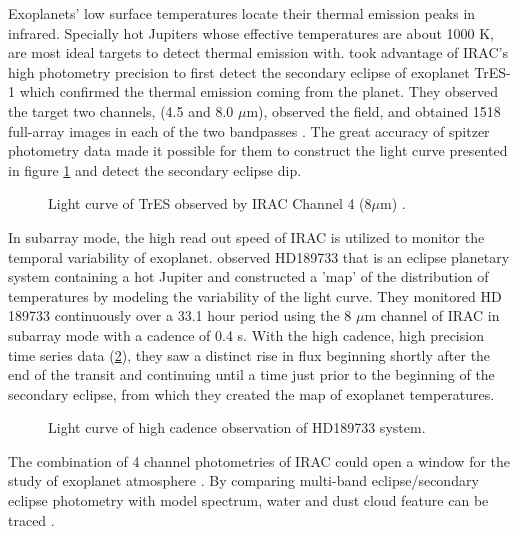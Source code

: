 \documentclass[preprint, 12pt]{aastex}
\begin{document}
Exoplanets' low surface temperatures locate their thermal emission
peaks in infrared. Specially hot Jupiters whose effective
temperatures are about 1000 K, are most ideal targets to detect
thermal emission with. \citep{2005ApJ...626..523C} took advantage of IRAC's
high photometry precision to first detect the secondary eclipse of
exoplanet TrES-1 which confirmed the thermal emission coming from the
planet. They observed the target two channels, (4.5 and 8.0 $\mu$m),
observed the field, and obtained 1518 full-array images in each of the
two bandpasses \citep{2005ApJ...626..523C}. The great accuracy of spitzer
photometry data made it possible for them to construct the light curve
presented in figure \ref{fig:irac-lc} and detect the secondary eclipse
dip.\par

\begin{figure}
  \centering
  \caption{Light curve of TrES observed by IRAC Channel 4 (8$\mu$m)
    \citep{2005ApJ...626..523C}.}
  \label{fig:irac-lc}
\end{figure}

In subarray mode, the high read out speed of IRAC is utilized to
monitor the temporal variability of exoplanet. \citet{2007Natur.447..183K}
observed HD189733 that is an eclipse planetary system containing a hot
Jupiter and constructed a ’map’ of the distribution of temperatures by
modeling the variability of the light curve. They monitored HD 189733
continuously over a 33.1 hour period using the 8 $\mu$m channel of
IRAC in subarray mode with a cadence of 0.4 s. With the high cadence,
high precision time series data (\ref{fig:iraf-lc2}), they saw a
distinct rise in flux beginning shortly after the end of the transit
and continuing until a time just prior to the beginning of the
secondary eclipse, from which they created the map of exoplanet
temperatures.\par

\begin{figure}
  \centering
  \caption{Light curve of high cadence observation of HD189733
    system\citep{2007Natur.447..183K}. }
  \label{fig:iraf-lc2}
\end{figure}

The combination of 4 channel photometries of IRAC could open a window
for the study of exoplanet atmosphere \citep{2014PNAS..11112601B}. By comparing
multi-band eclipse/secondary eclipse photometry with model spectrum,
water and dust cloud feature can be traced \citep{2010ApJ...710.1551O}.
\end{document}
